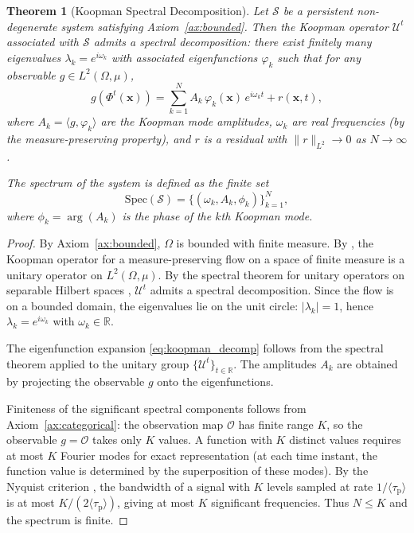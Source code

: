 \documentclass[11pt,twocolumn,a4paper]{article}
\newtheorem{theorem}{Theorem}[section]
\newcommand{\R}{\mathbb{R}}
\newcommand{\taup}{\tau_{\mathrm{p}}}
\newcommand{\Spec}{\mathrm{Spec}}
\begin{document}
\begin{theorem}[Koopman Spectral Decomposition]
\label{thm:koopman_spectral}
Let $\mathcal{S}$ be a persistent non-degenerate system satisfying
Axiom~\ref{ax:bounded}. Then the Koopman operator $\mathcal{U}^t$
associated with $\mathcal{S}$ admits a spectral decomposition: there
exist finitely many eigenvalues $\lambda_k = e^{i\omega_k}$ with
associated eigenfunctions $\varphi_k$ such that for any observable
$g \in L^2(\Omega, \mu)$,
\begin{equation}
\label{eq:koopman_decomp}
  g(\Phi^t(\mathbf{x})) = \sum_{k=1}^{N} A_k \, \varphi_k(\mathbf{x})
    \, e^{i\omega_k t} + r(\mathbf{x}, t),
\end{equation}
where $A_k = \langle g, \varphi_k \rangle$ are the Koopman mode
amplitudes, $\omega_k$ are real frequencies (by the measure-preserving
property), and $r$ is a residual with $\|r\|_{L^2} \to 0$ as
$N \to \infty$.

The spectrum of the system is defined as the finite set
\begin{equation}
\label{eq:spectrum_def}
  \Spec(\mathcal{S}) = \{(\omega_k, A_k, \phi_k)\}_{k=1}^{N},
\end{equation}
where $\phi_k = \arg(A_k)$ is the phase of the $k$th Koopman mode.
\end{theorem}

\begin{proof}
By Axiom~\ref{ax:bounded}, $\Omega$ is bounded with finite measure.
By \citet{koopman1931}, the Koopman operator for a measure-preserving
flow on a space of finite measure is a unitary operator on
$L^2(\Omega, \mu)$. By the spectral theorem for unitary operators on
separable Hilbert spaces \citep{vonneumann1932}, $\mathcal{U}^t$ admits
a spectral decomposition. Since the flow is on a bounded domain,
the eigenvalues lie on the unit circle: $|\lambda_k| = 1$, hence
$\lambda_k = e^{i\omega_k}$ with $\omega_k \in \R$.

The eigenfunction expansion
\eqref{eq:koopman_decomp} follows from the spectral theorem applied to
the unitary group $\{\mathcal{U}^t\}_{t \in \R}$. The amplitudes
$A_k$ are obtained by projecting the observable $g$ onto the
eigenfunctions.

Finiteness of the significant spectral components follows from
Axiom~\ref{ax:categorical}: the observation map $\mathcal{O}$ has
finite range $K$, so the observable $g = \mathcal{O}$ takes only $K$
values. A function with $K$ distinct values requires at most $K$
Fourier modes for exact representation (at each time instant, the
function value is determined by the superposition of these modes).
By the Nyquist criterion \citep{nyquist1928}, the bandwidth of a signal
with $K$ levels sampled at rate $1/\langle\taup\rangle$ is at most
$K/(2\langle\taup\rangle)$, giving at most $K$ significant frequencies.
Thus $N \leq K$ and the spectrum is finite.
\end{proof}
\end{document}
